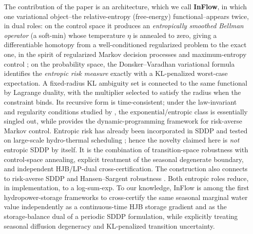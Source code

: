 \documentclass[pdflatex,sn-mathphys-num]{sn-jnl}
\theoremstyle{thmstyleone}
\theoremstyle{thmstyletwo}
\theoremstyle{thmstylethree}
\begin{document}
The contribution of the paper is an architecture, which we call
\textbf{InFlow}, in which one variational object--the relative-entropy
(free-energy) functional--appears twice, in dual roles:
on the control space it produces an \emph{entropically smoothed Bellman
operator} (a soft-min) whose temperature $\eta$ is annealed to zero,
giving a differentiable homotopy from a well-conditioned regularized
problem to the exact one, in the spirit of regularized Markov decision
processes \citep{geist2019} and maximum-entropy control
\citep{todorov2009,kappen2005}; on the probability space, the
Donsker--Varadhan variational formula \citep{dupuis1997} identifies the
\emph{entropic risk measure} exactly with a KL-penalized worst-case
expectation. A fixed-radius KL ambiguity set is connected to the same
functional by Lagrange duality, with the multiplier selected to satisfy the
radius when the constraint binds. Its recursive form is
time-consistent; under the law-invariant and regularity conditions studied by
\citet{kupper2009}, the exponential/entropic class is essentially singled out,
while \citet{ruszczynski2010} provides the dynamic-programming framework for
risk-averse Markov control. Entropic risk has already been incorporated in
SDDP and tested on large-scale hydro-thermal scheduling
\citep{dowson2025convex}; hence the novelty claimed here is \emph{not}
entropic SDDP by itself. It is the combination of transition-space robustness
with control-space annealing, explicit treatment of the seasonal degenerate
boundary, and independent HJB/LP-dual cross-certification. The construction
also connects to risk-averse SDDP
\citep{shapiro2011,philpott2013,shapiro2013risk} and
Hansen--Sargent robustness \citep{hansen2008}. Both entropic roles reduce, in
implementation, to a log-sum-exp. To our knowledge, InFlow is among the first
hydropower-storage frameworks to cross-certify the same seasonal marginal
water value independently as a continuous-time HJB storage gradient and as the
storage-balance dual of a periodic SDDP formulation, while explicitly treating
seasonal diffusion degeneracy and KL-penalized transition uncertainty.
\end{document}

